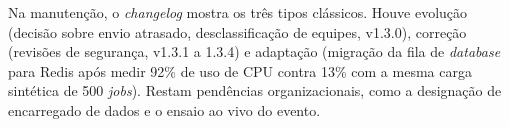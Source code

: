 Na manutenção, o \textit{changelog} mostra os três tipos clássicos. Houve evolução (decisão sobre envio atrasado, desclassificação de equipes, v1.3.0), correção (revisões de segurança, v1.3.1 a 1.3.4) e adaptação (migração da fila de \textit{database} para Redis após medir 92\% de uso de CPU contra 13\% com a mesma carga sintética de 500 \textit{jobs}). Restam pendências organizacionais, como a designação de encarregado de dados e o ensaio ao vivo do evento.
